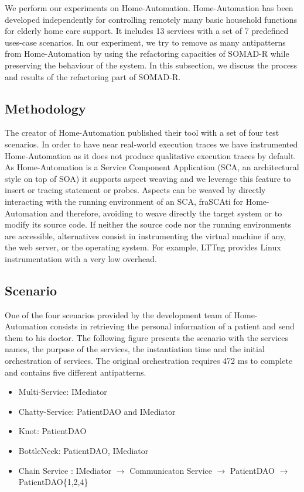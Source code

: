 \documentclass[lnbip]{svmultln}
\begin{document}
We perform our experiments on Home-Automation. Home-Automation has been developed independently for controlling remotely many basic household functions for elderly home care support. It includes 13 services with a set of 7 predefined uses-case scenarios. In our experiment, we try to remove as many antipatterns from Home-Automation by using the refactoring capacities of SOMAD-R while preserving the behaviour of the system. 
In this subsection, we discuss the process and results of the refactoring part of SOMAD-R.


\subsection{Methodology}

The creator of Home-Automation published their tool with a set of four test scenarios. In order to have near real-world execution traces we have instrumented Home-Automation as it does not produce qualitative execution traces by default. As Home-Automation is a Service Component Application (SCA, an architectural style on top of SOA) it supports aspect weaving and we leverage this feature to insert or tracing statement or probes. Aspects can be weaved by directly interacting with the running environment of an SCA, fraSCAti for Home-Automation and therefore, avoiding to weave directly the target system or to modify its source code. If neither the source code nor the running environments are accessible, alternatives consist in instrumenting the virtual machine if any, the web server, or the operating system. For example, LTTng \cite{Fournier2009} provides Linux instrumentation with a very low overhead.  

\subsection{Scenario}

One of the four scenarios provided by the development team of Home-Automation consists in retrieving the personal information of a patient and send them to his doctor. The following figure presents the scenario with the services names, the purpose of the services, the instantiation time and the initial orchestration of services. The original orchestration requires 472 ms to complete and contains five different antipatterns.


\begin{itemize}
  \item Multi-Service: IMediator
  \item Chatty-Service: PatientDAO and IMediator
  \item Knot: PatientDAO
  \item BottleNeck: PatientDAO, IMediator
  \item Chain Service : IMediator $\rightarrow$ Communicaton Service $\rightarrow$ PatientDAO $\rightarrow$ PatientDAO\{1,2,4\}
\end{itemize}
\end{document}
